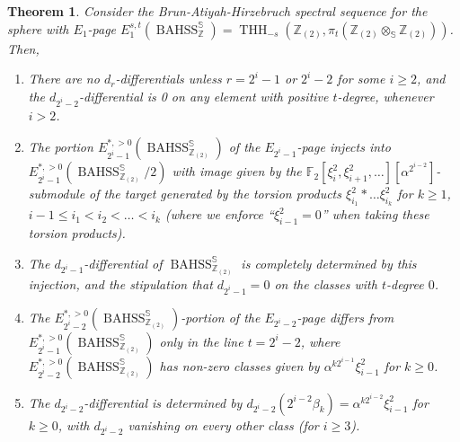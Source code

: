 \documentclass[11pt,leqno]{article}
\newcommand{\zz}{\mathbb{Z}}
\newcommand{\sss}{\mathbb{S}}
\newcommand{\fff}{\mathbb{F}}
\DeclareMathOperator{\THH}{THH}
\newcommand{\mo}[1]{\operatorname{#1}}
\newtheorem*{short hand}{theorem name}
\theoremstyle{plain}  %
\newtheorem{theorem}{Theorem}[section]
\theoremstyle{definition}
\numberwithin{equation}{section}
\begin{document}
\begin{theorem}\label{th3.13}
Consider the Brun-Atiyah-Hirzebruch spectral sequence for the sphere with $E_1$-page $E_1^{s,t}(\mo{BAHSS}_{\zz}^{\sss})=\THH_{-s}(\zz_{(2)},\pi_{t}(\zz_{(2)}\otimes_{\sss}\zz_{(2)}))$.  Then,
\begin{enumerate}
\item  There are no $d_r$-differentials unless $r=2^{i}-1$ or $2^{i}-2$ for some $i\geq 2$, and the $d_{2^{i}-2}$-differential is 0 on any element with positive $t$-degree, whenever $i>2$.
\item The portion $E_{2^{i}-1}^{*,>0}(\mo{BAHSS}_{\zz_{(2)}}^{\sss})$ of the $E_{2^{i}-1}$-page injects into $E_{2^{i}-1}^{*,>0}(\mo{BAHSS}_{\zz_{(2)}}^{\sss}/2)$ with image given by the $\fff_2[\xi_i^2,\xi_{i+1}^2,\ldots][\alpha^{2^{i-2}}]$-submodule of the target generated by the torsion products $\xi_{i_1}^2*\ldots \xi_{i_k}^2$ for $k\geq 1$, $i-1\leq i_1<i_2<\ldots <i_k$ (where we enforce ``$\xi_{i-1}^2=0$'' when taking these torsion products).
\item The $d_{2^{i}-1}$-differential of $\mo{BAHSS}_{\zz_{(2)}}^{\sss}$ is completely determined by this injection, and the stipulation that $d_{2^{i}-1}=0$ on the classes with $t$-degree $0$.
\item  The $E_{2^{i}-2}^{*,>0}(\mo{BAHSS}_{\zz_{(2)}}^{\sss})$-portion of the $E_{2^i-2}$-page differs from $E_{2^{i}-1}^{*,>0}(\mo{BAHSS}_{\zz_{(2)}}^{\sss})$ only in the line $t=2^{i}-2$, where $E_{2^{i}-2}^{*,>0}(\mo{BAHSS}_{\zz_{(2)}}^{\sss})$ has non-zero classes given by $\alpha^{k2^{i-1}}\xi_{i-1}^2$ for $k\geq 0$.
\item  The $d_{2^{i}-2}$-differential is determined by $d_{2^{i}-2}(2^{i-2}\beta_{k})=\alpha^{k2^{i-2}}\xi_{i-1}^2$ for $k\geq 0$, with $d_{2^{i}-2}$ vanishing on every other class (for $i\geq 3$).
\end{enumerate}   
\end{theorem}
\end{document}

